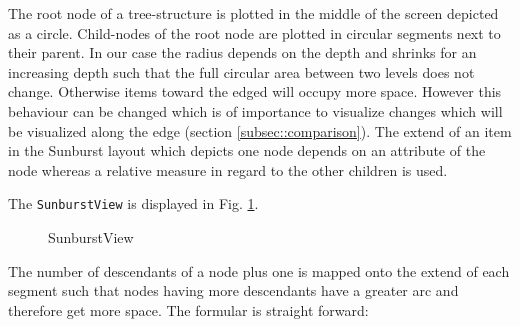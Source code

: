 \begin{itemize}
The root node of a tree-structure is plotted in the middle of the screen depicted as a circle. Child-nodes of the root node are plotted in circular segments next to their parent. In our case the radius depends on the depth and shrinks for an increasing depth such that the full circular area between two levels does not change. Otherwise items toward the edged will occupy more space. However this behaviour can be changed which is of importance to visualize changes which will be visualized along the edge (section \ref{subsec::comparison}). The extend of an item in the Sunburst layout which depicts one node depends on an attribute of the node whereas a relative measure in regard to the other children is used.  

The \texttt{SunburstView} is displayed in Fig. \ref{fig:sunburstview}.

\begin{figure}[tb]
\caption{\label{fig:sunburstview} SunburstView}
\end{figure}

The number of descendants of a node plus one is mapped onto the extend of each segment such that nodes having more descendants have a greater arc and therefore get more space. The formular is straight forward:


\end{itemize}
